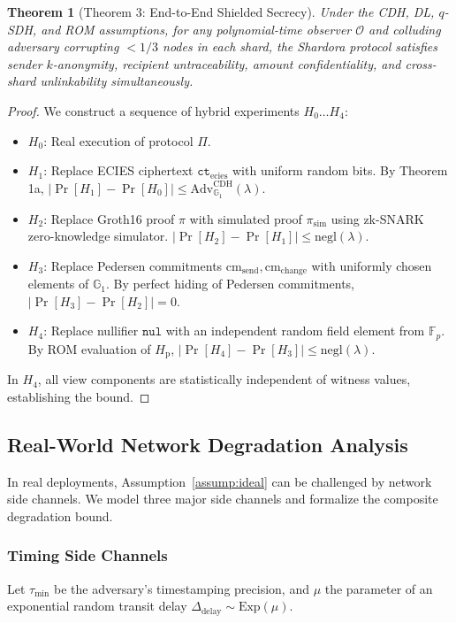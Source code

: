 \documentclass[journal,10pt,twocolumn]{IEEEtran}
\newtheorem{theorem}{Theorem}
\theoremstyle{definition}
\theoremstyle{remark}
\begin{document}
\begin{theorem}[Theorem 3: End-to-End Shielded Secrecy]\label{thm:main_secrecy}
Under the CDH, DL, $q$-SDH, and ROM assumptions, for any polynomial-time observer $\mathcal{O}$ and colluding adversary corrupting $< 1/3$ nodes in each shard, the Shardora protocol satisfies sender $k$-anonymity, recipient untraceability, amount confidentiality, and cross-shard unlinkability simultaneously.
\end{theorem}

\begin{proof}
We construct a sequence of hybrid experiments $H_0 \dots H_4$:
\begin{itemize}[leftmargin=*]
    \item $H_0$: Real execution of protocol $\Pi$.
    \item $H_1$: Replace ECIES ciphertext $\mathtt{ct}_{\text{ecies}}$ with uniform random bits. By Theorem 1a, $| \Pr[H_1] - \Pr[H_0] | \le \text{Adv}^{\text{CDH}}_{\mathbb{G}_1}(\lambda)$.
    \item $H_2$: Replace Groth16 proof $\pi$ with simulated proof $\pi_{\text{sim}}$ using zk-SNARK zero-knowledge simulator. $| \Pr[H_2] - \Pr[H_1] | \le \text{negl}(\lambda)$.
    \item $H_3$: Replace Pedersen commitments $\text{cm}_{\text{send}}, \text{cm}_{\text{change}}$ with uniformly chosen elements of $\mathbb{G}_1$. By perfect hiding of Pedersen commitments, $| \Pr[H_3] - \Pr[H_2] | = 0$.
    \item $H_4$: Replace nullifier $\mathtt{nul}$ with an independent random field element from $\mathbb{F}_p$. By ROM evaluation of $H_{\text{p}}$, $| \Pr[H_4] - \Pr[H_3] | \le \text{negl}(\lambda)$.
\end{itemize}
In $H_4$, all view components are statistically independent of witness values, establishing the bound.
\end{proof}

\subsection{Real-World Network Degradation Analysis}
In real deployments, Assumption~\ref{assump:ideal} can be challenged by network side channels. We model three major side channels and formalize the composite degradation bound.

\subsubsection{Timing Side Channels}
Let $\tau_{\min}$ be the adversary's timestamping precision, and $\mu$ the parameter of an exponential random transit delay $\Delta_{\text{delay}} \sim \text{Exp}(\mu)$.
\end{document}
